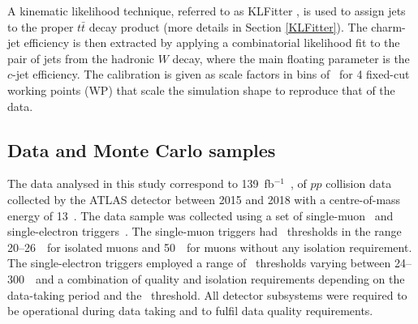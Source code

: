 \documentclass[letterpaper,12pt]{article}
\begin{document}

A kinematic likelihood technique, referred to as 
KLFitter \cite{ERDMANN201418}, is used to assign jets to the proper $t\bar{t}$ decay product 
(more details in Section \ref{KLFitter}). 
The charm-jet efficiency is then extracted by applying a combinatorial likelihood fit to the pair 
of jets from the hadronic $W$ decay, where the main floating parameter is the $c$-jet efficiency. 
The calibration is given as scale factors in bins of \pt\ for 4 fixed-cut working points (WP) 
that scale the simulation shape to reproduce that of the data.

\subsection{Data and Monte Carlo samples}

\label{sec:samples}
The data analysed in this study correspond to 139~fb$^{-1}$~\cite{DAPR-2010-01,DAPR-2011-01,DAPR-2013-01,LUCID2}, 
of \(pp\) collision data collected by the ATLAS detector between 2015 and 2018
with a centre-of-mass energy of 13~\TeV. 
The data sample was collected using a set of single-muon~\cite{Aad:2020uyd} 
and single-electron triggers~\cite{TRIG-2018-05}. The single-muon triggers 
had \pt\ thresholds in the range 20--26~\GeV\ for 
isolated muons and 50~\GeV\ for muons without any isolation requirement. 
The single-electron triggers employed a range of \pt\ thresholds 
varying between 24--300~\GeV\ 
and a combination of quality and isolation requirements depending on the 
data-taking period and the \pt\ threshold.
All detector subsystems were required to be operational
during data taking and to fulfil data quality requirements.  
\end{document}
